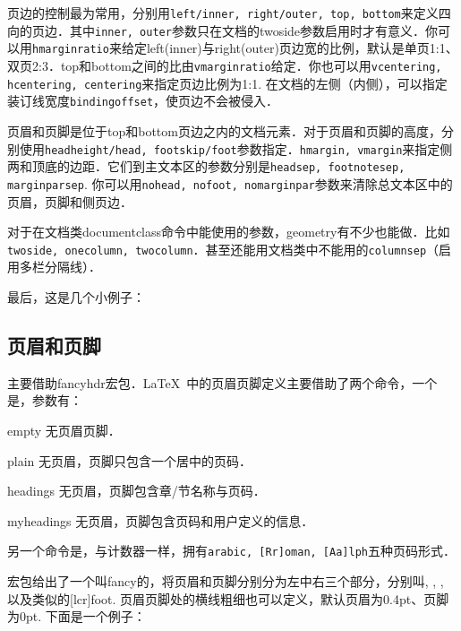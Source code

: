页边的控制最为常用，分别用\texttt{left/inner, right/outer, top, bottom}来定义四向的页边．其中\texttt{inner, outer}参数只在文档的twoside参数启用时才有意义．你可以用\texttt{hmarginratio}来给定left(inner)与right(outer)页边宽的比例，默认是单页1:1、双页2:3．top和bottom之间的比由\texttt{vmarginratio}给定．你也可以用\texttt{vcentering, hcentering, centering}来指定页边比例为1:1. 在文档的左侧（内侧），可以指定装订线宽度\texttt{bindingoffset}，使页边不会被侵入．

页眉和页脚是位于top和bottom页边之内的文档元素．对于页眉和页脚的高度，分别使用\texttt{headheight/head, footskip/foot}参数指定．\texttt{hmargin, vmargin}来指定侧两和顶底的边距．它们到主文本区的参数分别是\texttt{headsep, footnotesep, marginparsep}. 你可以用\texttt{nohead, nofoot, nomarginpar}参数来清除总文本区中的页眉，页脚和侧页边．

对于在文档类documentclass命令中能使用的参数，geometry有不少也能做．比如\texttt{twoside, onecolumn, twocolumn}．甚至还能用文档类中不能用的\texttt{columnsep}（启用多栏分隔线）．

最后，这是几个小例子：
\begin{latex}
\usepackage[hmargin=1.25in,vmargin=1in]{geometry}
\usepackage[inner=1in,outer=1.25in]{geometry}
\end{latex}

\subsection{页眉和页脚}
主要借助fancyhdr宏包．\LaTeX\ 中的页眉页脚定义主要借助了两个命令，一个是，参数有：
\begin{para}
\item[empty] 无页眉页脚．
\item[plain] 无页眉，页脚只包含一个居中的页码．
\item[headings] 无页眉，页脚包含章/节名称与页码．
\item[myheadings] 无页眉，页脚包含页码和用户定义的信息．
\end{para}

另一个命令是，与计数器一样，拥有\texttt{arabic, [Rr]oman, [Aa]lph}五种页码形式．

宏包给出了一个叫fancy的，将页眉和页脚分别分为左中右三个部分，分别叫, , , 以及类似的[lcr]foot. 页眉页脚处的横线粗细也可以定义，默认页眉为0.4pt、页脚为0pt. 下面是一个例子：
\begin{latex}
\usepackage{fancyhdr}
\pagestyle{fancy}
    \lhead{}
    \chead{}
    \cfoot{\thepage}
\renewcommand{\headrulewidth}{0.4pt}
\renewcommand{\footrulewidth}{0.4pt}
\end{latex}

